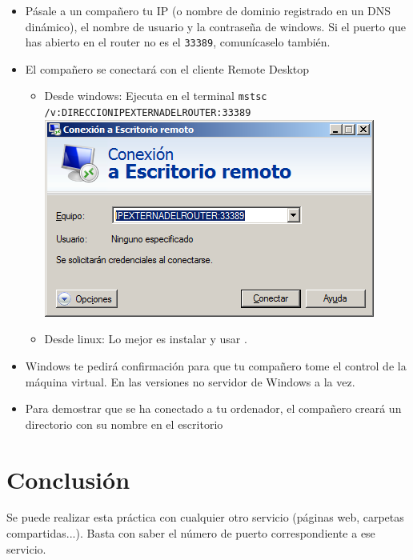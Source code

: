 \begin{homeworkProblem}
  \begin{itemize}
  \item Pásale a un compañero tu IP (o nombre de dominio registrado en un DNS dinámico), el nombre de usuario y la contraseña de windows. Si el puerto que has abierto en el router no es el \texttt{33389}, comunícaselo también.
  \item El compañero se conectará con el cliente Remote Desktop
    \begin{itemize}
    \item Desde windows: Ejecuta en el terminal \texttt{mstsc /v:DIRECCIONIPEXTERNADELROUTER:33389}
      \includegraphics{./media/conexion-con-mstsc.png}
    \item Desde linux: Lo mejor es instalar y usar .
    \end{itemize}
  \item Windows te pedirá confirmación para que tu compañero tome el control de la máquina virtual. En las versiones no servidor de Windows  a la vez.  
  \item Para demostrar que se ha conectado a tu ordenador, el compañero creará un directorio con su nombre en el escritorio
  \end{itemize}
  
\end{homeworkProblem}


\section{Conclusión}

Se puede realizar esta práctica con cualquier otro servicio (páginas web, carpetas compartidas...). Basta con saber el número de puerto correspondiente a ese servicio.



